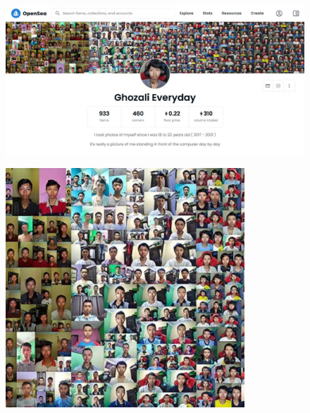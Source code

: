 \documentclass{beamer}
\begin{document}
\begin{frame}
\begin{columns}
\begin{column}{0.5\textwidth}
            \begin{figure}[htbp]
                \centering
                \includegraphics[width=\textwidth]{p3.jpg}
            \end{figure}
            \begin{figure}[htbp]
                \centering
                \includegraphics[width=0.8\textwidth]{p2.jpg}
            \end{figure}
        \end{column}
    \end{columns}
\end{frame}
\end{document}
